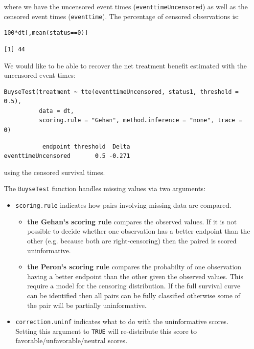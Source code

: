 \documentclass[12pt]{article}
\begin{document}
where we have the uncensored event times (\texttt{eventtimeUncensored}) as well as the censored event
times (\texttt{eventtime}). The percentage of censored observations is:
\lstset{language=r,label= ,caption= ,captionpos=b,numbers=none}
\begin{lstlisting}
100*dt[,mean(status==0)]
\end{lstlisting}

\begin{verbatim}
[1] 44
\end{verbatim}


We would like to be able to recover the net treatment benefit estimated with the uncensored event times:
\lstset{language=r,label= ,caption= ,captionpos=b,numbers=none}
\begin{lstlisting}
BuyseTest(treatment ~ tte(eventtimeUncensored, status1, threshold = 0.5),
          data = dt,
          scoring.rule = "Gehan", method.inference = "none", trace = 0)
\end{lstlisting}

\begin{verbatim}
           endpoint threshold  Delta
eventtimeUncensored       0.5 -0.271
\end{verbatim}


using the censored survival times.

\clearpage

The \texttt{BuyseTest} function handles missing values via two arguments:
\begin{itemize}
\item \texttt{scoring.rule} indicates how pairs involving missing data are compared. 
\begin{itemize}
\item \textbf{the Gehan's scoring rule} compares the observed values. If it is
not possible to decide whether one observation has a better
endpoint than the other (e.g. because both are right-censoring)
then the paired is scored uninformative.
\item \textbf{the Peron's scoring rule} compares the probabilty of one
observation having a better endpoint than the other given the
observed values. This require a model for the censoring
distribution. If the full survival curve can be identified then
all pairs can be fully classified otherwise some of the pair
will be partially uninformative.
\end{itemize}
\item \texttt{correction.uninf} indicates what to do with the uninformative
scores. Setting this argument to \texttt{TRUE} will re-distribute this
score to favorable/unfavorable/neutral scores.
\end{itemize}
\end{document}
